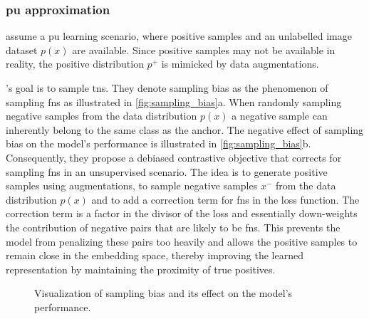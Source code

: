 \subsubsection{\acl{pu} approximation}\label{subsec:pu_approximation}

\citet{chuang_debiased_2020} assume a \acf{pu} learning scenario, 
where positive samples and an unlabelled image dataset $p(x)$ are available.
Since positive samples may not be available in reality, 
the positive distribution $p^+$ is mimicked by data augmentations.

\citeauthor{chuang_debiased_2020}'s goal is to sample \acp{tn}.
They denote sampling bias as the phenomenon of sampling \acp{fn} as illustrated in \autoref{fig:sampling_bias}a.
When randomly sampling negative samples from the data distribution $p(x)$ 
a negative sample can inherently belong to the same class as the anchor.
The negative effect of sampling bias on the model's performance is illustrated in \autoref{fig:sampling_bias}b. %
Consequently, they propose a debiased contrastive objective that corrects for sampling \acp{fn} 
in an unsupervised scenario.
The idea is to generate positive samples using augmentations,
to sample negative samples $x^-$ from the data distribution $p(x)$
and to add a correction term for \acp{fn} in the loss function. 
The correction term is a factor in the divisor of the loss and 
essentially down-weights the contribution of negative pairs that are likely to be \acp{fn}. 
This prevents the model from penalizing these pairs too heavily and 
allows the positive samples to remain close in the embedding space, 
thereby improving the learned representation by maintaining the proximity of true positives.

\begin{figure}%
    \centering
    \qquad
    \caption{Visualization of sampling bias and its effect on the model's performance.}%
    \label{fig:sampling_bias}%
\end{figure}